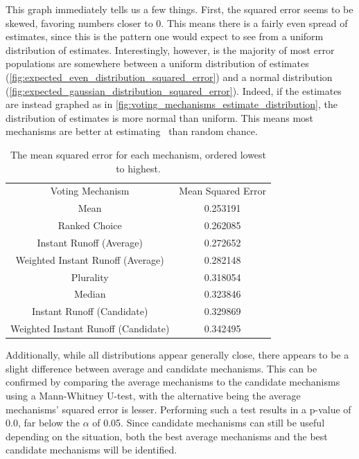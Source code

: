 This graph immediately tells us a few things.
First, the squared error seems to be skewed, favoring numbers closer to 0.
This means there is a fairly even spread of estimates, since this is the
pattern one would expect to see from a uniform distribution of estimates.
Interestingly, however, is the majority of most error populations are
somewhere between a uniform distribution of estimates
(\autoref{fig:expected_even_distribution_squared_error}) and a normal
distribution (\autoref{fig:expected_gaussian_distribution_squared_error}).
Indeed, if the estimates are instead graphed as in
\autoref{fig:voting_mechanisms_estimate_distribution}, the distribution of estimates
is more normal than uniform.
This means most mechanisms are better at estimating \truth\ than random chance.

\begin{table}[htbp]
    \renewcommand{\arraystretch}{1.0}

    \caption{The mean squared error for each mechanism, ordered lowest to highest.}
    \label{tab:voting-mechanism-mean-error}

    \centering
    \begin{tabular}{|c|c|}
        \hline
        Voting Mechanism                    & Mean Squared Error \\
        \hhline{|=|=|}
        Mean                                & 0.253191           \\
        \hline
        Ranked Choice                       & 0.262085           \\
        \hline
        Instant Runoff (Average)            & 0.272652           \\
        \hline
        Weighted Instant Runoff (Average)   & 0.282148           \\
        \hline
        Plurality                           & 0.318054           \\
        \hline
        Median                              & 0.323846           \\
        \hline
        Instant Runoff (Candidate)          & 0.329869           \\
        \hline
        Weighted Instant Runoff (Candidate) & 0.342495           \\
        \hline
    \end{tabular}
\end{table}

Additionally, while all distributions appear generally close, there appears to be a
slight difference between average and candidate mechanisms.
This can be confirmed by comparing the average mechanisms to the candidate mechanisms
using a Mann-Whitney U-test, with the alternative being the average mechanisms'
squared error is lesser.
Performing such a test results in a p-value of 0.0, far below the $\alpha$ of 0.05.
Since candidate mechanisms can still be useful depending on the situation, both the
best average mechanisms and the best candidate mechanisms will be identified.

